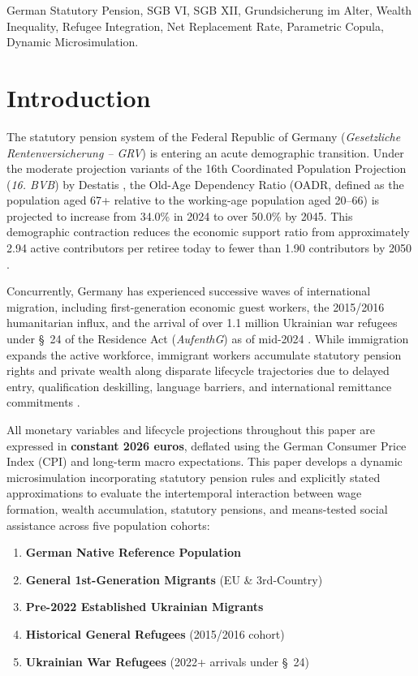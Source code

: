 \documentclass[conference]{IEEEtran}
\begin{document}
\begin{IEEEkeywords}
German Statutory Pension, SGB VI, SGB XII, Grundsicherung im Alter, Wealth Inequality, Refugee Integration, Net Replacement Rate, Parametric Copula, Dynamic Microsimulation.
\end{IEEEkeywords}

\section{Introduction}
The statutory pension system of the Federal Republic of Germany (\textit{Gesetzliche Rentenversicherung -- GRV}) is entering an acute demographic transition. Under the moderate projection variants of the 16th Coordinated Population Projection (\textit{16. BVB}) by Destatis \cite{destatis2024bvb}, the Old-Age Dependency Ratio (OADR, defined as the population aged 67+ relative to the working-age population aged 20--66) is projected to increase from 34.0\% in 2024 to over 50.0\% by 2045. This demographic contraction reduces the economic support ratio from approximately 2.94 active contributors per retiree today to fewer than 1.90 contributors by 2050 \cite{boersch2025nachhaltigkeit, ec2024ageing}.

Concurrently, Germany has experienced successive waves of international migration, including first-generation economic guest workers, the 2015/2016 humanitarian influx, and the arrival of over 1.1 million Ukrainian war refugees under \S~24 of the Residence Act (\textit{AufenthG}) as of mid-2024 \cite{iab2025refugees, kosyakova2024simulation}. While immigration expands the active workforce, immigrant workers accumulate statutory pension rights and private wealth along disparate lifecycle trajectories due to delayed entry, qualification deskilling, language barriers, and international remittance commitments \cite{dustmann2016temporary, fratzscher2021wealth}.

All monetary variables and lifecycle projections throughout this paper are expressed in \textbf{constant 2026 euros}, deflated using the German Consumer Price Index (CPI) and long-term macro expectations. This paper develops a dynamic microsimulation incorporating statutory pension rules and explicitly stated approximations to evaluate the intertemporal interaction between wage formation, wealth accumulation, statutory pensions, and means-tested social assistance across five population cohorts:
\begin{enumerate}
    \item \textbf{German Native Reference Population}
    \item \textbf{General 1st-Generation Migrants} (EU \& 3rd-Country)
    \item \textbf{Pre-2022 Established Ukrainian Migrants}
    \item \textbf{Historical General Refugees} (2015/2016 cohort)
    \item \textbf{Ukrainian War Refugees} (2022+ arrivals under \S~24)
\end{enumerate}
\end{document}
